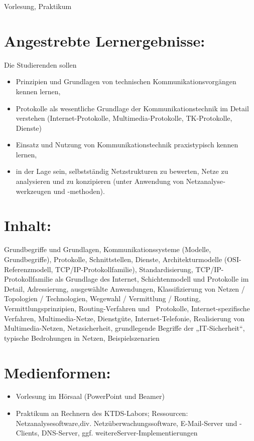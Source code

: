 Vorlesung, Praktikum

\section*{Angestrebte
Lernergebnisse:}\label{angestrebte-lernergebnisse-12}

Die Studierenden sollen

\begin{itemize}
\tightlist
\item
  Prinzipien und Grundlagen von technischen Kommunikations­vor­gängen
  kennen lernen,
\item
  Protokolle als wesentliche Grundlage der Kommunikationstechnik im
  Detail verstehen (Internet-Protokolle, Multimedia-Protokolle,
  TK-Protokolle, Dienste)
\item
  Einsatz und Nutzung von Kommunikations­tech­nik praxistypisch kennen
  lernen,
\item
  in der Lage sein, selbstständig Netzstrukturen zu bewerten, Netze zu
  analysieren und zu konzipieren (unter Anwendung von
  Netz­analyse­werkzeugen und -methoden).
\end{itemize}

\section*{Inhalt:}\label{inhalt-12}

Grundbegriffe und Grundlagen, Kommunikationssysteme (Modelle,
Grundbegriffe), Protokolle, Schnittstellen, Dienste, Architekturmodelle
(OSI-Referenzmodell, TCP/IP-Protokollfamilie), Standardisierung,
TCP/IP-Protokollfamilie als Grundlage des Internet, Schichtenmodell und
Protokolle im Detail, Adressierung, ausgewählte Anwendungen,
Klassifizierung von Netzen / Topologien / Technologien, Wegewahl /
Vermittlung / Routing, Vermittlungsprinzipien, Routing-Verfahren und~
Protokolle, Internet-spezifische Verfahren, Multimedia-Netze,
Dienstgüte, Internet-Telefonie, Realisierung von Multimedia-Netzen,
Netzsicherheit, grundlegende Begriffe der „IT-Sicherheit``, typische
Bedrohungen in Netzen, Beispielszenarien

\section*{Medienformen:}\label{medienformen-7}

\begin{itemize}
\tightlist
\item
  Vorlesung im Hörsaal (PowerPoint und Beamer)
\item
  Praktikum an Rechnern des KTDS-Labors; Ressourcen:
  Netzanalysesoftware,div. Netzüberwachungssoftware, E-Mail-Server und
  -Clients, DNS-Server, ggf. weitereServer-Implementierungen
\end{itemize}

